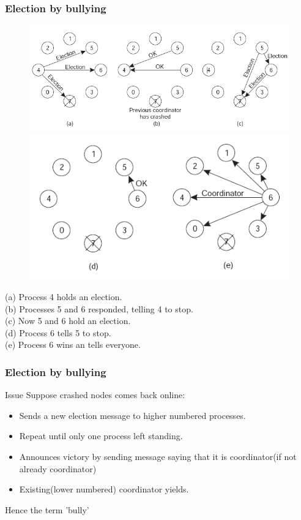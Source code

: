 \begin{frame}
    \frametitle{Election by bullying}
    \begin{figure}
        \centering
        \includegraphics[scale=0.4]{./figures/bully.png}
        \includegraphics[scale=0.4]{./figures/bully2.png}
    \end{figure}
(a) Process 4 holds an election. \\
(b) Processes 5 and 6 responded, telling 4 to stop. \\
(c) Now 5 and 6 hold an election. \\
(d) Process 6 tells 5 to stop. \\
(e) Process 6 wins an tells everyone.
\end{frame}

\begin{frame}
    \frametitle{Election by bullying}
    \begin{block}{Issue}
    Suppose crashed nodes comes back online:
    \begin{itemize}
        \item Sends a new election message to higher numbered processes.
        \item Repeat until only one process left standing.
        \item Announces victory by sending message saying that it is coordinator(if not already coordinator)
        \item Existing(lower numbered) coordinator yields.
    \end{itemize}
    \end{block}
    Hence the term 'bully'
\end{frame}

